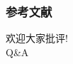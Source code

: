 \documentclass{beamer}
\begin{document}
\begin{frame}[allowframebreaks] %
   \frametitle{参考文献}
\tiny


\end{frame}


\begin{frame}
	\begin{center}
 		\huge {欢迎大家批评!}\\
		\vspace{1cm}
		\huge {Q\&A}
	\end{center}
\end{frame}
\end{document}
